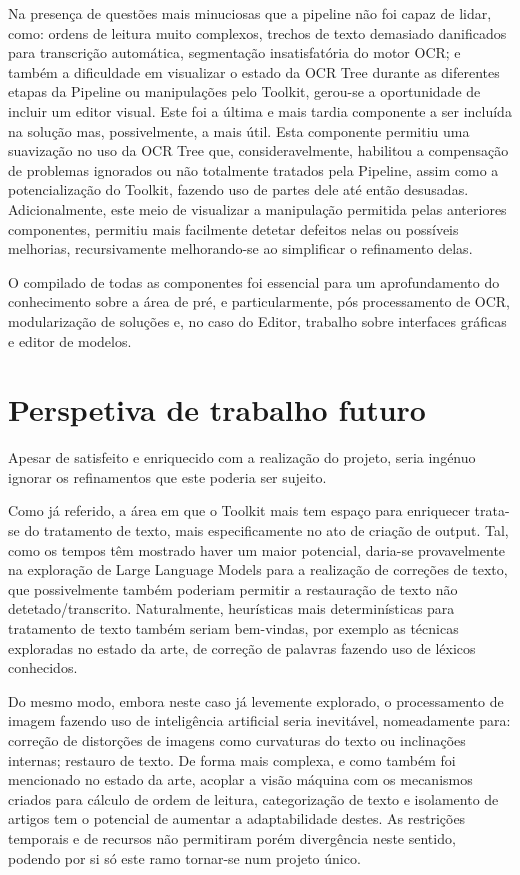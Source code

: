 Na presença de questões mais minuciosas que a pipeline não foi capaz de lidar, como: ordens de leitura muito complexos, trechos de texto demasiado danificados para transcrição automática, segmentação insatisfatória do motor OCR; e também a dificuldade em visualizar o estado da OCR Tree durante as diferentes etapas da Pipeline ou manipulações pelo Toolkit, gerou-se a oportunidade de incluir um editor visual. Este foi a última e mais tardia componente a ser incluída na solução mas, possivelmente, a mais útil. Esta componente permitiu uma suavização no uso da OCR Tree que, consideravelmente, habilitou a compensação de problemas ignorados ou não totalmente tratados pela Pipeline, assim como a potencialização do Toolkit, fazendo uso de partes dele até então desusadas. Adicionalmente, este meio de visualizar a manipulação permitida pelas anteriores componentes, permitiu mais facilmente detetar defeitos nelas ou possíveis melhorias, recursivamente melhorando-se ao simplificar o refinamento delas.

O compilado de todas as componentes foi essencial para um aprofundamento do conhecimento sobre a área de pré, e particularmente, pós processamento de OCR, modularização de soluções e, no caso do Editor, trabalho sobre interfaces gráficas e editor de modelos.



\section{Perspetiva de trabalho futuro}

Apesar de satisfeito e enriquecido com a realização do projeto, seria ingénuo ignorar os refinamentos que este poderia ser sujeito. 

Como já referido, a área em que o Toolkit mais tem espaço para enriquecer trata-se do tratamento de texto, mais especificamente no ato de criação de output. Tal, como os tempos têm mostrado haver um maior potencial, daria-se provavelmente na exploração de Large Language Models para a realização de correções de texto, que possivelmente também poderiam permitir a restauração de texto não detetado/transcrito. Naturalmente, heurísticas mais determinísticas para tratamento de texto também seriam bem-vindas, por exemplo as técnicas exploradas no estado da arte, de correção de palavras fazendo uso de léxicos conhecidos.

Do mesmo modo, embora neste caso já levemente explorado, o processamento de imagem fazendo uso de inteligência artificial seria inevitável, nomeadamente para: correção de distorções de imagens como curvaturas do texto ou inclinações internas; restauro de texto. De forma mais complexa, e como também foi mencionado no estado da arte, acoplar a visão máquina com os mecanismos criados para cálculo de ordem de leitura, categorização de texto e isolamento de artigos tem o potencial de aumentar a adaptabilidade destes. As restrições temporais e de recursos não permitiram porém divergência neste sentido, podendo por si só este ramo tornar-se num projeto único.

